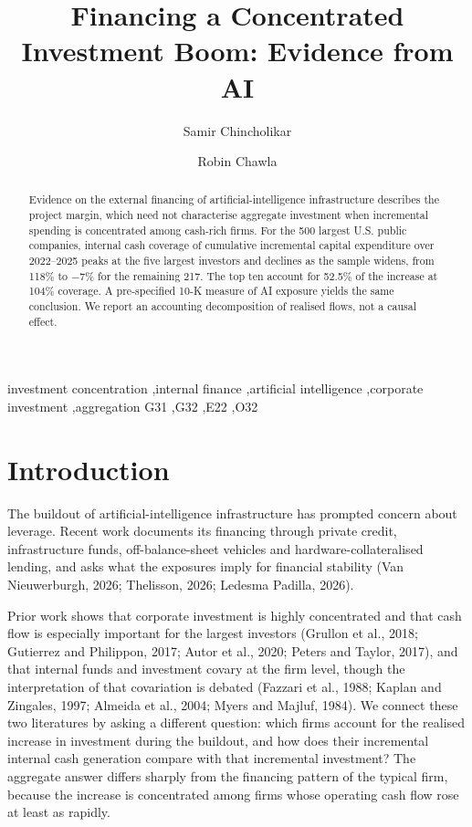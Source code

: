\documentclass[preprint,11pt]{elsarticle}
\begin{document}
\begin{frontmatter}
\title{Financing a Concentrated Investment Boom: Evidence from AI}
\author[a]{Samir Chincholikar}
\author[a]{Robin Chawla}
\begin{abstract}
Evidence on the external financing of artificial-intelligence infrastructure describes the project
margin, which need not characterise aggregate investment when incremental spending is concentrated
among cash-rich firms. For the 500 largest U.S. public companies, internal cash coverage of
cumulative incremental capital expenditure over 2022--2025 peaks at the five largest investors and
declines as the sample widens, from 118\% to $-7$\% for the remaining 217. The top ten account for
52.5\% of the increase at 104\% coverage. A pre-specified 10-K measure of AI exposure yields the same
conclusion. We report an accounting decomposition of realised flows, not a causal effect.
\end{abstract}
\begin{keyword}
investment concentration \sep internal finance \sep artificial intelligence \sep corporate
investment \sep aggregation
\JEL G31 \sep G32 \sep E22 \sep O32
\end{keyword}
\end{frontmatter}

\section{Introduction}
The buildout of artificial-intelligence infrastructure has prompted concern about leverage. Recent
work documents its financing through private credit, infrastructure funds, off-balance-sheet
vehicles and hardware-collateralised lending, and asks what the exposures imply for financial
stability (Van Nieuwerburgh, 2026; Thelisson, 2026; Ledesma Padilla, 2026).

Prior work shows that corporate investment is highly concentrated and that cash flow is especially
important for the largest investors (Grullon et al., 2018; Gutierrez and Philippon, 2017; Autor et
al., 2020; Peters and Taylor, 2017), and that internal funds and investment covary at the firm
level, though the interpretation of that covariation is debated (Fazzari et al., 1988; Kaplan and
Zingales, 1997; Almeida et al., 2004; Myers and Majluf, 1984). We connect these two literatures by
asking a different question: which firms account for the realised increase in investment during the
buildout, and how does their incremental internal cash generation compare with that incremental
investment? The aggregate answer differs sharply from the financing pattern of the typical firm,
because the increase is concentrated among firms whose operating cash flow rose at least as rapidly.
\end{document}
